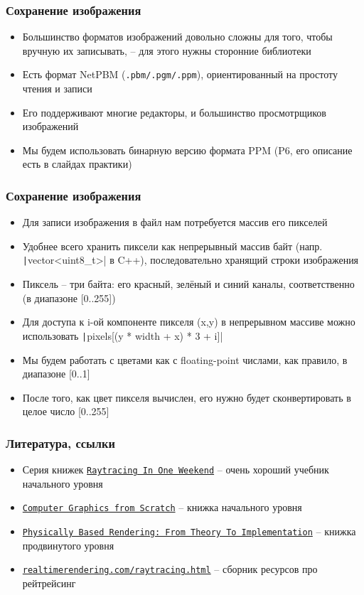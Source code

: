 \documentclass[10pt,handout]{beamer}
\begin{document}
\begin{frame}
\frametitle{Сохранение изображения}
\begin{itemize}
\item Большинство форматов изображений довольно сложны для того, чтобы вручную их записывать, -- для этого нужны сторонние библиотеки
\pause
\item Есть формат NetPBM (\texttt{.pbm/.pgm/.ppm}), ориентированный на простоту чтения и записи
\pause
\item Его поддерживают многие редакторы, и большинство просмотрщиков изображений
\pause
\item Мы будем использовать бинарную версию формата PPM (P6, его описание есть в слайдах практики)
\end{itemize}
\end{frame}

\begin{frame}
\frametitle{Сохранение изображения}
\begin{itemize}
\item Для записи изображения в файл нам потребуется массив его пикселей
\pause
{}
\item Удобнее всего хранить пиксели как непрерывный массив байт (напр. \texttt|vector<uint8_t>| в C++), последовательно хранящий строки изображения
\pause
\item Пиксель -- три байта: его {\color{red}красный}, {\color{green}зелёный} и {\color{blue}синий} каналы, соответственно (в диапазоне [0..255])
\pause
\item Для доступа к i-ой компоненте пикселя (x,y) в непрерывном массиве можно использовать \texttt|pixels[(y * width + x) * 3 + i]|
\pause
\item Мы будем работать с цветами как с floating-point числами, как правило, в диапазоне [0..1]
\pause
\item После того, как цвет пикселя вычислен, его нужно будет сконвертировать в целое число [0..255]
\end{itemize}
\end{frame}

\begin{frame}
\frametitle{Литература, ссылки}
\begin{itemize}
\item Серия книжек \href{https://raytracing.github.io/}{\texttt{Raytracing In One Weekend}} -- очень хороший учебник начального уровня
\item \href{https://www.gabrielgambetta.com/computer-graphics-from-scratch/}{\texttt{Computer Graphics from Scratch}} -- книжка начального уровня
\item \href{https://www.pbr-book.org/}{\texttt{Physically Based Rendering: From Theory To Implementation}} -- книжка продвинутого уровня
\item \href{https://www.realtimerendering.com/raytracing.html}{\texttt{realtimerendering.com/raytracing.html}} -- сборник ресурсов про рейтрейсинг
\end{itemize}
\end{frame}
\end{document}
